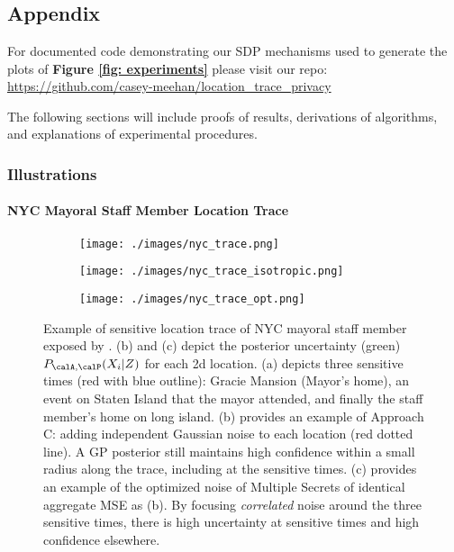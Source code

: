 \graphicspath{{./chapters/chapter5/}}
\chapter{ }

\section{Appendix}
For documented code demonstrating our SDP mechanisms used to generate the plots of \textbf{Figure \ref{fig: experiments}} please visit our repo: \url{https://github.com/casey-meehan/location_trace_privacy} 

The following sections will include proofs of results, derivations of algorithms, and explanations of experimental procedures. 
\subsection{Illustrations}
\label{apx: Illustrations}

\subsubsection{NYC Mayoral Staff Member Location Trace}

\begin{figure*}[h]
	\centering
	\begin{subfigure}[b]{.32\textwidth}
		\centering
		\texttt{[image: ./images/nyc\_trace.png]}
		\caption{}
		\label{fig:nyc_trace}
	\end{subfigure}
	\begin{subfigure}[b]{.32\textwidth}
		\centering
		\texttt{[image: ./images/nyc\_trace\_isotropic.png]}
		\caption{}
		\label{fig:nyc_trace_iso}
	\end{subfigure}
	\begin{subfigure}[b]{.32\textwidth}
		\centering
		\texttt{[image: ./images/nyc\_trace\_opt.png]}
		\caption{}
		\label{fig:nyc_trace_opt}
	\end{subfigure}
	\caption{Example of sensitive location trace of NYC mayoral staff member exposed by \citep{nyt}. (b) and (c) depict the posterior uncertainty (green) $P_{\calA,\calP}(X_i | Z)$ for each 2d location. (a) depicts three sensitive times (red with blue outline): Gracie Mansion (Mayor's home), an event on Staten Island that the mayor attended, and finally the staff member's home on long island. (b) provides an example of Approach C: adding independent Gaussian noise to each location (red dotted line). A GP posterior still maintains high confidence within a small radius along the trace, including at the sensitive times. (c) provides an example of the optimized noise of Multiple Secrets of identical aggregate MSE as (b). By focusing \textit{correlated} noise around the three sensitive times, there is high uncertainty at sensitive times and high confidence elsewhere.}
	\label{fig:nyc_example}
\end{figure*}

